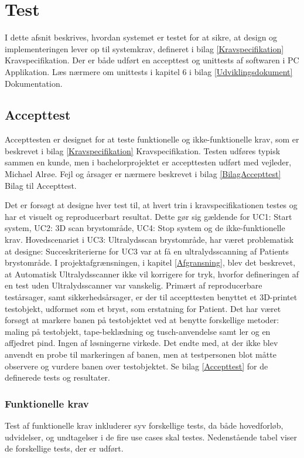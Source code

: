\chapter{Test}\label{Test}
I dette afsnit beskrives, hvordan systemet er testet for at sikre, at design og implementeringen lever op til systemkrav, defineret i bilag \ref{Kravspecifikation} Kravspecifikation. Der er både udført en accepttest og unittests af softwaren i PC Applikation. Læs nærmere om unittests i kapitel 6 i bilag \ref{Udviklingsdokument} Dokumentation.

\section{Accepttest}
Accepttesten er designet for at teste funktionelle og ikke-funktionelle krav, som er beskrevet i bilag \ref{Kravspecifikation} Kravspecifikation. Testen udføres typisk sammen en kunde, men i bachelorprojektet er accepttesten udført med vejleder, Michael Alrøe.  Fejl og årsager er nærmere beskrevet i bilag \ref{BilagAccepttest} Bilag til Accepttest.  

Det er forsøgt at designe hver test til, at hvert trin i kravspecifikationen testes og har et visuelt og reproducerbart resultat. Dette gør sig gældende for UC1: Start system, UC2: 3D scan brystområde, UC4: Stop system og de ikke-funktionelle krav. Hovedscenariet i UC3: Ultralydsscan brystområde, har været problematisk at designe: Succeskriterierne for UC3 var at få en ultralydsscanning af Patients brystområde. I projektafgrænsningen, i kapitel \ref{Afgransning}, blev det beskrevet, at Automatisk Ultralydsscanner ikke vil korrigere for tryk, hvorfor defineringen af en test uden Ultralydsscanner var vanskelig. Primært af reproducerbare testårsager, samt sikkerhedsårsager, er der til accepttesten benyttet et 3D-printet testobjekt, udformet som et bryst, som erstatning for Patient. Det har været forsøgt at markere banen på testobjektet ved at benytte forskellige metoder: maling på testobjekt, tape-beklædning og tusch-anvendelse samt ler og en affjedret pind. Ingen af løsningerne virkede. Det endte med, at der ikke blev anvendt en probe til markeringen af banen, men at testpersonen blot måtte observere og vurdere banen over testobjektet. Se bilag \ref{Accepttest} for de definerede tests og resultater.
\newpage
\subsection{Funktionelle krav} 
Test af funktionelle krav inkluderer syv forskellige tests, da både hovedforløb, udvidelser, og undtagelser i de fire use cases skal testes. Nedenstående tabel viser de forskellige tests, der er udført. 

